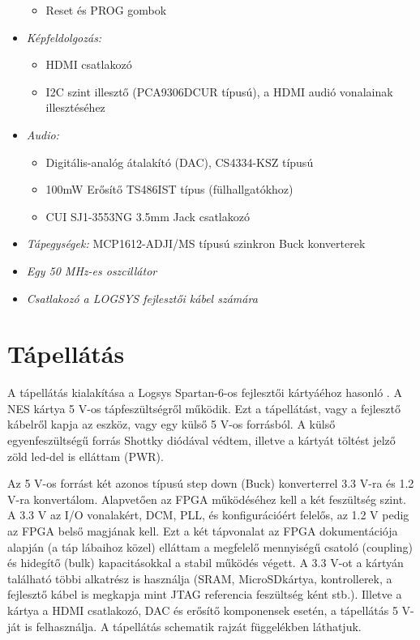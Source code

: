 \begin{itemize}
\begin{itemize}
			\item Reset és PROG gombok
		\end{itemize}	
	\item \emph{Képfeldolgozás:}
		\begin{itemize}
			\item HDMI csatlakozó 
			\item I2C szint illesztő (PCA9306DCUR típusú), a HDMI audió vonalainak illesztéséhez 
		\end{itemize}
	\item \emph{Audio:}
		\begin{itemize}
			\item Digitális-analóg átalakító (DAC), CS4334-KSZ típusú  
			\item 100mW Erősítő TS486IST típus (fülhallgatókhoz)
			\item CUI SJ1-3553NG 3.5mm Jack csatlakozó
		\end{itemize}
	\item \emph{Tápegységek:} MCP1612-ADJI/MS típusú szinkron Buck konverterek
	\item \emph{Egy 50 MHz-es oszcillátor} 
	\item \emph{Csatlakozó a LOGSYS fejlesztői kábel számára} 
\end{itemize}
	
\section{Tápellátás}
	
	A tápellátás kialakítása a Logsys Spartan-6-os fejlesztői kártyáéhoz hasonló \cite{spatan6}. A NES kártya 5 V-os tápfeszültségről működik. Ezt a tápellátást, vagy a fejlesztő kábelről kapja az eszköz, vagy egy külső 5 V-os forrásból. A külső egyenfeszültségű forrás Shottky diódával védtem, illetve a kártyát töltést jelző zöld led-del is elláttam (PWR). 
	
	Az 5 V-os forrást két azonos típusú step down (Buck) konverterrel 3.3 V-ra és 1.2 V-ra konvertálom. Alapvetően az FPGA működéséhez kell a két feszültség szint. A 3.3 V az I/O vonalakért, DCM, PLL, és konfigurációért felelős, az 1.2 V pedig az FPGA belső magjának kell. Ezt a két tápvonalat az FPGA dokumentációja alapján (a táp lábaihoz közel) elláttam a megfelelő mennyiségű csatoló (coupling) és hidegítő (bulk) kapacitásokkal a stabil működés végett. A 3.3 V-ot a kártyán található többi alkatrész is használja (SRAM, MicroSDkártya, kontrollerek, a fejlesztő kábel is megkapja mint JTAG referencia feszültség ként stb.). Illetve a kártya a HDMI csatlakozó, DAC és erősítő komponensek esetén, a tápellátás 5 V-ját is felhasználja. A tápellátás schematik rajzát  függelékben láthatjuk. 
	 
